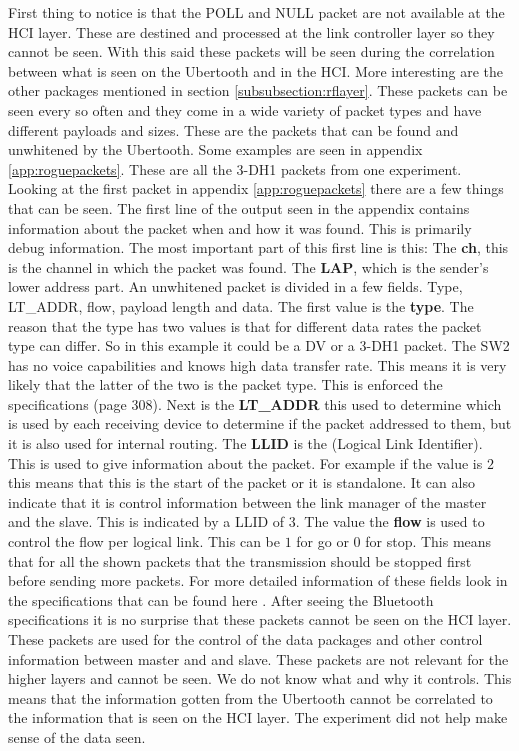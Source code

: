 First thing to notice is that the POLL and NULL packet are not available at the HCI layer. These are destined and processed at the link controller layer so they cannot be seen. With this said these packets will be seen during the correlation between what is seen on the Ubertooth and in the HCI. More interesting are the other packages mentioned in section \ref{subsubsection:rflayer}. These packets can be seen every so often and they come in a wide variety of packet types and have different payloads and sizes.
These are the packets that can be found and unwhitened by the Ubertooth.
Some examples are seen in appendix \ref{app:roguepackets}. These are all the 3-DH1 packets from one experiment. Looking at the first packet in appendix \ref{app:roguepackets} there are a few things that can be seen. The first line of the output seen in the appendix contains information about the packet when and how it was found. This is primarily debug information. The most important part of this first line is this:
The \textbf{ch}, this is the channel in which the packet was found.
The \textbf{LAP}, which is the sender's lower address part. \pend
An unwhitened packet is divided in a few fields. Type, LT\_ADDR, flow, payload length and data.
The first value is the \textbf{type}. The reason that the type has two values is that for different data rates the packet type can differ. So in this example it could be a DV or a 3-DH1 packet. The SW2 has no voice capabilities and knows high data transfer rate. This means it is very likely that the latter of the two is the packet type. This is enforced the specifications \cite{bt3.0}(page 308).
Next is the \textbf{LT\_ADDR} this used to determine which is used by each receiving device to determine if the packet addressed to them, but it is also used for internal routing.
The \textbf{LLID} is the (Logical Link Identifier). This is used to give information about the packet. For example if the value is $2$ this means that this is the start of the packet or it is standalone. It can also indicate that it is control information between the link manager of the master and the slave. This is indicated by a LLID of $3$.
The value the \textbf{flow} is used to control the flow per logical link. This can be $1$ for go or $0$ for stop. This means that for all the shown packets that the transmission should be stopped first before sending more packets.
For more detailed information of these fields look in the specifications that can be found here \cite{bt3.0}.
After seeing the Bluetooth specifications it is no surprise that these packets cannot be seen on the HCI layer. These packets are used for the control of the data packages and other control information between master and and slave. These packets are not relevant for the higher layers and cannot be seen. We do not know what and why it controls. This means that the information gotten from the Ubertooth cannot be correlated to the information that is seen on the HCI layer. The experiment did not help make sense of the data seen.